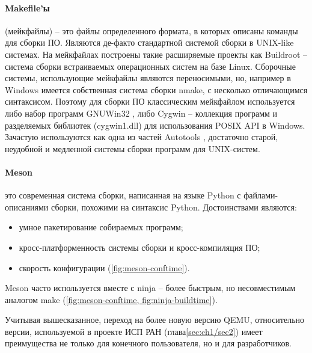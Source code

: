 \paragraph{Makefile'ы} \cite{make} (мейкфайлы) -- это файлы определенного формата,
в которых описаны команды для сборки ПО.
Являются де-факто стандартной системой сборки в UNIX-like системах.
На мейкфайлах построены такие расширяемые проекты как Buildroot \cite{buildroot} --
система сборки встраиваемых операционных систем на базе Linux.
Сборочные системы, использующие мейкфайлы являются переносимыми, но, например в Windows
имеется собственная система сборки nmake, с несколько отличающимся синтаксисом.
Поэтому для сборки ПО классическим мейкфайлом используется либо набор программ GNUWin32 \cite{gnuwin32}, либо Cygwin \cite{cygwin} --
коллекция программ и разделяемых библиотек (cygwin1.dll) для использования POSIX API в Windows.
Зачастую используются как одна из частей Autotools \cite{autotools},
достаточно старой, неудобной и медленной системы сборки программ для UNIX-систем.

\paragraph{Meson} \cite{meson} это современная система сборки, написанная на языке Python с файлами-описаниями
сборки, похожими на синтаксис Python. Достоинствами являются:
\begin{itemize}
    \item умное пакетирование собираемых программ;
    \item кросс-платформенность системы сборки и кросс-компиляция ПО;
    \item скорость конфигурации (\cref{fig:meson-conftime}).
\end{itemize}

Meson часто используется вместе с ninja \cite{ninja} -- более быстрым,
но несовместимым аналогом make (\cref{fig:meson-conftime, fig:ninja-buildtime}).

Учитывая вышесказанное, переход на более новую версию QEMU, относительно
версии, используемой в проекте ИСП РАН (глава\cref{sec:ch1/sec2})
имеет преимущества не только для конечного пользователя, но и для разработчиков.


